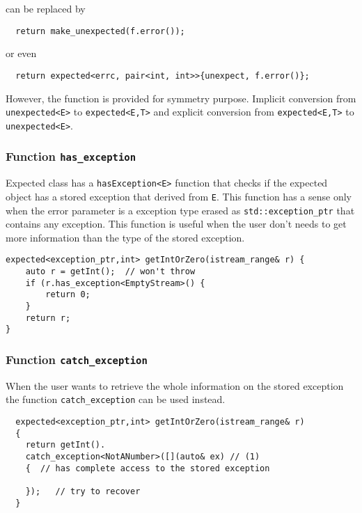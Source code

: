 \documentclass[a4paper,10pt]{article}
\newcommand{\cpp}[1]{\lstinline{#1}}
\begin{document}
can be replaced by

\begin{lstlisting}
  return make_unexpected(f.error());
\end{lstlisting}

or even

\begin{lstlisting}
  return expected<errc, pair<int, int>>{unexpect, f.error()};
\end{lstlisting}

However, the function is provided for symmetry purpose. Implicit conversion from \cpp{unexpected<E>} to \cpp{expected<E,T>} and explicit conversion from  \cpp{expected<E,T>} to  \cpp{unexpected<E>}. 

\subsubsection{Function \cpp{has_exception}}

\cite{AlexandrescuExpected} Expected class has a \cpp{hasException<E>} function that checks if the expected object has a stored exception that derived from \cpp{E}. This function has a sense only when the error parameter is a exception type erased as \cpp{std::exception_ptr} that contains any exception. This function is useful when the user don't needs to get more information than the type of the stored exception.

\begin{lstlisting}
expected<exception_ptr,int> getIntOrZero(istream_range& r) {
    auto r = getInt();  // won't throw
    if (r.has_exception<EmptyStream>() {
        return 0;
    }
    return r;
}
\end{lstlisting}


\subsubsection{Function \cpp{catch_exception}}

When the user wants to retrieve the whole information on the stored exception the function \cpp{catch_exception}  can be used instead.

\begin{lstlisting}
  expected<exception_ptr,int> getIntOrZero(istream_range& r) 
  {
    return getInt().
    catch_exception<NotANumber>([](auto& ex) // (1)
    {  // has complete access to the stored exception
  
    });   // try to recover
  }
\end{lstlisting}
\end{document}

